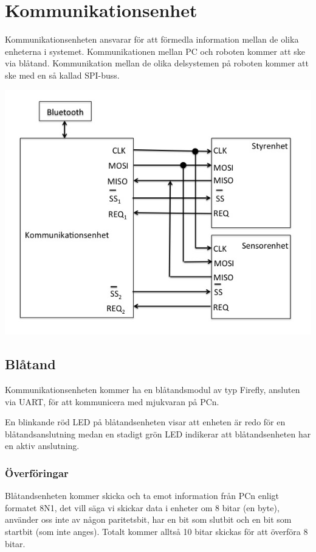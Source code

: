 \section{Kommunikationsenhet}
Kommunikationsenheten ansvarar för att förmedla information mellan de olika enheterna i systemet. 
Kommunikationen mellan PC och roboten kommer att ske via blåtand. Kommunikation mellan de olika delsystemen på roboten kommer att ske med en så kallad SPI-buss.

\includegraphics[angle=0,scale=0.5]{bilder/SPI-buss.png}

\subsection{Blåtand}
Kommunikationsenheten kommer ha en blåtandsmodul av typ Firefly, ansluten via
UART, för att kommunicera med mjukvaran på PCn.

En blinkande röd LED på blåtandsenheten visar att enheten är redo för en
blåtandsanslutning medan en stadigt grön LED indikerar att blåtandsenheten har
en aktiv anslutning.

\subsubsection{Överföringar}
Blåtandsenheten kommer skicka och ta emot information från PCn enligt formatet
8N1, det vill säga vi skickar data i enheter om 8 bitar (en byte), använder oss
inte av någon paritetsbit, har en bit som slutbit och en bit som startbit
(som inte anges). Totalt kommer alltså 10 bitar skickas för att överföra 8
bitar.


